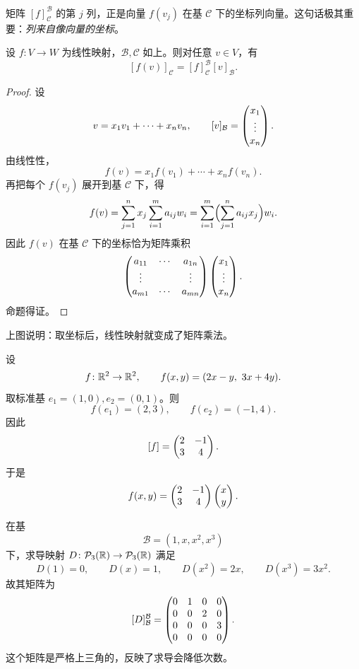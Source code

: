 \begin{remark}
矩阵 $[f]_{\mathcal C}^{\mathcal B}$ 的第 $j$ 列，正是向量 $f(v_j)$ 在基 $\mathcal C$ 下的坐标列向量。这句话极其重要：\emph{列来自像向量的坐标}。
\end{remark}

\begin{proposition}
设 $f\colon V\to W$ 为线性映射，$\mathcal B,\mathcal C$ 如上。则对任意 $v\in V$，有
\[
  [f(v)]_{\mathcal C}=[f]_{\mathcal C}^{\mathcal B}[v]_{\mathcal B}.
\]
\end{proposition}

\begin{proof}
设
\[
  v=x_1v_1+\cdots+x_nv_n,
  \qquad
  [v]_{\mathcal B}=\begin{pmatrix} x_1\\ \vdots\\ x_n \end{pmatrix}.
\]
由线性性，
\[
  f(v)=x_1f(v_1)+\cdots+x_nf(v_n).
\]
再把每个 $f(v_j)$ 展开到基 $\mathcal C$ 下，得
\[
  f(v)=\sum_{j=1}^n x_j\sum_{i=1}^m a_{ij}w_i
  =\sum_{i=1}^m\Bigl(\sum_{j=1}^n a_{ij}x_j\Bigr)w_i.
\]
因此 $f(v)$ 在基 $\mathcal C$ 下的坐标恰为矩阵乘积
\[
  \begin{pmatrix} a_{11} & \cdots & a_{1n}\\ \vdots & & \vdots\\ a_{m1} & \cdots & a_{mn} \end{pmatrix}
  \begin{pmatrix} x_1\\ \vdots\\ x_n \end{pmatrix}.
\]
命题得证。
\end{proof}

\begin{center}
\end{center}

上图说明：取坐标后，线性映射就变成了矩阵乘法。

\begin{example}[标准基下的矩阵]
设
\[
  f\colon \mathbb{R}^2\to\mathbb{R}^2,
  \qquad
  f(x,y)=(2x-y,\ 3x+4y).
\]
取标准基 $e_1=(1,0),e_2=(0,1)$。则
\[
  f(e_1)=(2,3),\qquad f(e_2)=(-1,4).
\]
因此
\[
  [f]=\begin{pmatrix} 2 & -1\\ 3 & 4 \end{pmatrix}.
\]
于是
\[
  f(x,y)=\begin{pmatrix} 2 & -1\\ 3 & 4 \end{pmatrix}\begin{pmatrix} x\\ y \end{pmatrix}.
\]
\end{example}

\begin{example}[求导算子的矩阵]
在基
\[
  \mathcal B=(1,x,x^2,x^3)
\]
下，求导映射 $D\colon \mathcal P_3(\mathbb{R})\to\mathcal P_3(\mathbb{R})$ 满足
\[
  D(1)=0,\qquad D(x)=1,\qquad D(x^2)=2x,\qquad D(x^3)=3x^2.
\]
故其矩阵为
\[
  [D]_{\mathcal B}^{\mathcal B}=
  \begin{pmatrix} 0 & 1 & 0 & 0\\
       0 & 0 & 2 & 0\\
       0 & 0 & 0 & 3\\
       0 & 0 & 0 & 0 \end{pmatrix}.
\]
这个矩阵是严格上三角的，反映了求导会降低次数。
\end{example}

